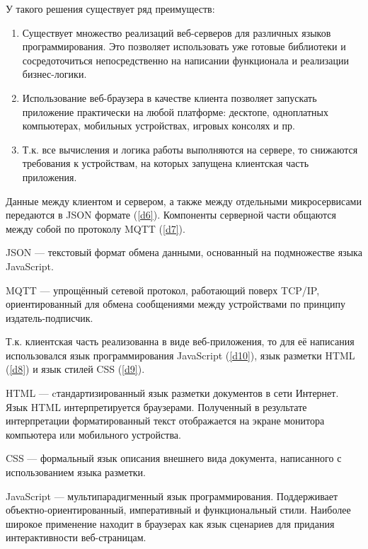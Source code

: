 У такого решения существует ряд преимуществ:
\begin{enumerate}
    \item Существует множество реализаций веб-серверов для различных языков программирования.
    Это позволяет использовать уже готовые библиотеки и сосредоточиться непосредственно на написании функционала
    и реализации бизнес-логики.
    \item Использование веб-браузера в качестве клиента позволяет запускать приложение практически на любой платформе:
    десктопе, одноплатных компьютерах, мобильных устройствах, игровых консолях и пр.
    \item Т.к. все вычисления и логика работы выполняются на сервере, то снижаются требования к устройствам, на которых
    запущена клиентская часть приложения.
\end{enumerate}
Данные между клиентом и сервером, а также между отдельными микросервисами передаются в JSON формате (\ref{d6}). Компоненты
серверной части общаются между собой по протоколу MQTT (\ref{d7}).
\begin{definition}
    \label{d6}
    JSON — текстовый формат обмена данными, основанный на подмножестве языка JavaScript.
\end{definition}
\begin{definition}
    \label{d7}
    MQTT — упрощённый сетевой протокол, работающий поверх TCP/IP, ориентированный для обмена сообщениями между устройствами
    по принципу издатель-подписчик. 
\end{definition}
Т.к. клиентская часть реализованна в виде веб-приложения, то для её написания использовался язык программирования
JavaScript (\ref{d10}), язык разметки HTML (\ref{d8}) и язык стилей CSS (\ref{d9}).
\begin{definition}
    \label{d8}
    HTML — cтандартизированный язык разметки документов в сети Интернет.
    Язык HTML интерпретируется браузерами. Полученный в результате интерпретации форматированный текст
    отображается на экране монитора компьютера или мобильного устройства.
\end{definition}
\begin{definition}
    \label{d9}
    CSS — формальный язык описания внешнего вида документа, написанного с использованием языка разметки.
\end{definition}
\begin{definition}
    \label{d10}
    JavaScript — мультипарадигменный язык программирования. Поддерживает объектно-ориентированный, императивный и
    функциональный стили. Наиболее широкое применение находит в браузерах как язык сценариев для придания интерактивности
    веб-страницам.
\end{definition}
